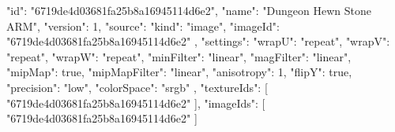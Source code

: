 {
  "id": "6719de4d03681fa25b8a16945114d6e2",
  "name": "Dungeon Hewn Stone ARM",
  "version": 1,
  "source": {
    "kind": "image",
    "imageId": "6719de4d03681fa25b8a16945114d6e2"
  },
  "settings": {
    "wrapU": "repeat",
    "wrapV": "repeat",
    "wrapW": "repeat",
    "minFilter": "linear",
    "magFilter": "linear",
    "mipMap": true,
    "mipMapFilter": "linear",
    "anisotropy": 1,
    "flipY": true,
    "precision": "low",
    "colorSpace": "srgb"
  },
  "textureIds": [
    "6719de4d03681fa25b8a16945114d6e2"
  ],
  "imageIds": [
    "6719de4d03681fa25b8a16945114d6e2"
  ]
}
